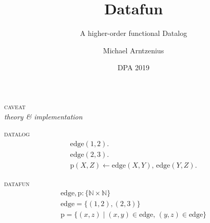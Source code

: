 \documentclass[dvipsnames,fleqn]{beamer}
\title{Datafun}
\subtitle{A higher-order functional Datalog}
\author{Michael Arntzenius}
\institute{University of Birmingham}
\date{DPA 2019}
\providecommand\EMPH\textsc
\newcommand\x\times
\newcommand\N{\mathbb{N}}
\newcommand\kw\textbf
\newcommand\name\text
\newcommand\tset[1]{\{{#1}\}}
\newcommand\eset[1]{\{{#1}\}}
\newcommand\esetfor[2]{\eset{{#1} \mathrel{|} {#2}}}
\newcommand\efor[1]{\kw{for}\;{#1}\;\kw{do}\;}
\newcommand\ewhen[1]{\kw{when}\;{#1}\;\kw{do}\;}
\newcommand\shaded{\color{gray}}
\newcommand\DATALOG{\EMPH{datalog}}
\newcommand\DATAFUN{\EMPH{datafun}}
\begin{document}
\maketitle

\Large

\begin{frame}{}
  \centering \huge
  \EMPH{caveat}
  \\[1ex]
  \itshape
  {theory}
  \&
  {implementation}
\end{frame}

\newcommand\whereami[1]{
\begin{frame}
  \centering
\end{frame}
}


\whereami{0}

\begin{frame}\setlength\mathindent{.67em}
  \DATALOG\vspace{-.5ex}
  \[
  \begin{array}{l}
    \name{edge}(1,2).\\\name{edge}(2,3).\\
    \name{p}(X,Z) \gets \name{edge}(X,Y),\, \name{edge}(Y,Z).
  \end{array}
  \]
  \vspace{0pt} %

  \DATAFUN\vspace{-.5ex}
  \[
  \begin{array}{l}
    \name{edge}, \name{p} : \tset{\N \x \N}\\
    \name{edge} = \eset{(1,2), (2,3)}\\
    \name{p} =
    \esetfor{(x,z)}{(x,y) \in \name{edge},\, (y,z) \in \name{edge}}
  \end{array}
  \]
  \vfill
\end{frame}
\end{document}

